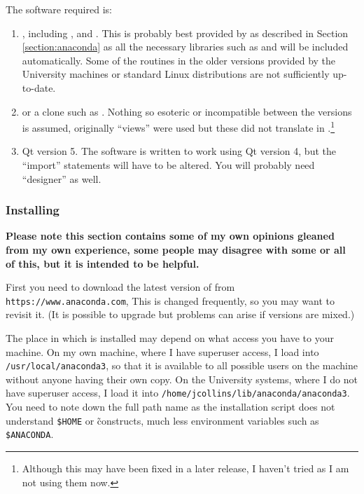 The software required is:

\begin{enumerate}
  \item \py, including \numpy, {\scipy} and \mpl. This is probably best
  provided by {\anac} as described in Section \ref{section:anaconda} as all the
  necessary libraries such as {\numpy} and {\scipy} will be included
  automatically. Some of the routines in the older versions provided by the
  University machines or standard Linux distributions are not sufficiently
  up-to-date.
  \item {\mysql} or a clone such as \maria. Nothing so esoteric or incompatible
  between the versions is assumed, originally ``views'' were used but these did
  not translate in \maria.\footnote{Although this may have been fixed in a
  later release, I haven't tried as I am not using them now.}
  \item Qt version 5. The software is written to work using Qt version 4, but
  the {\py} ``import'' statements will have to be altered. You will probably need
  ``designer'' as well.
\end{enumerate}

\subsubsection{Installing \anac}
\protect\label{section:anaconda}

\textbf{Please note this section contains some of my own opinions gleaned from
my own experience, some people may disagree with some or all of this, but it is
intended to be helpful.}

First you need to download the latest version of {\anac} from
\texttt{https://www.anaconda.com}, This is changed frequently, so you may want
to revisit it. (It is possible to upgrade but problems can arise if versions
are mixed.)

The place in which {\anac} is installed may depend on what access you have to
your machine. On my own machine, where I have superuser access, I load {\anac} into
\texttt{/usr/local/anaconda3}, so that it is available to all possible users on
the machine without anyone having their own copy. On the University systems,
where I do not have superuser access, I load it into
\texttt{/home/jcollins/lib/anaconda/anaconda3}.
You need to note down the full path name as the installation script does not
understand \texttt{\$HOME} or \~ constructs, much less environment variables
such as \texttt{\$ANACONDA}.

